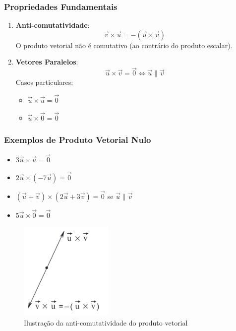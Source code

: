 \subsubsection*{Propriedades Fundamentais}
\begin{enumerate}
    \item \textbf{Anti-comutatividade}:
    \begin{equation}
      \vec{v} \times \vec{u} = -(\vec{u} \times \vec{v})
      \label{eq:anti_comutatividade}
    \end{equation}
    O produto vetorial não é comutativo (ao contrário do produto escalar).
    
    \item \textbf{Vetores Paralelos}:
    \begin{equation}
      \vec{u} \times \vec{v} = \vec{0} \iff \vec{u} \parallel \vec{v}
      \label{eq:paralelos}
    \end{equation}
    Casos particulares:
    \begin{itemize}
      \item $\vec{u} \times \vec{u} = \vec{0}$
      \item $\vec{u} \times \vec{0} = \vec{0}$
    \end{itemize}
\end{enumerate}

\subsubsection*{Exemplos de Produto Vetorial Nulo}
\begin{itemize}
  \item $3\vec{u} \times \vec{u} = \vec{0}$
  \item $2\vec{u} \times (-7\vec{u}) = \vec{0}$
  \item $(\vec{u}+\vec{v}) \times (2\vec{u}+3\vec{v}) = \vec{0}$ se $\vec{u} \parallel \vec{v}$
  \item $5\vec{u} \times \vec{0} = \vec{0}$
\end{itemize}

\begin{figure}[h]
  \centering
  \includegraphics[width=0.4\textwidth]{./fig/fig3.1.png}
  \caption{Ilustração da anti-comutatividade do produto vetorial}
  \label{fig:fig3.1}
\end{figure}

